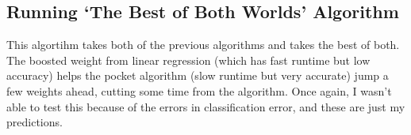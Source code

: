\documentclass[a4paper]{article}
\begin{document}
\subsection{Running `The Best of Both Worlds' Algorithm }
This algortihm takes both of the previous algorithms and takes the best of both. The boosted weight from linear regression (which has fast runtime but low accuracy) helps the pocket algorithm (slow runtime but very accurate) jump a few weights ahead, cutting some time from the algorithm. Once again, I wasn't able to test this because of the errors in classification error, and these are just my predictions.
\end{document}
